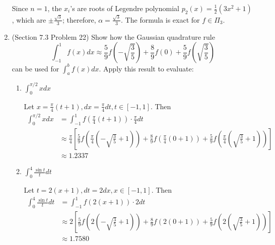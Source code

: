 \documentclass[10pt]{report}
\newcommand{\dintt}[4] {\int_{#1}^{#2} #3 d#4}
\begin{document}
\begin{enumerate}
	Since $n=1$, the $x_i$'s are roots of Legendre polynomial $p_2(x) = \frac{1}{2}(3x^2 + 1)$, which are $\pm \frac{\sqrt{3}}{3}$; therefore, $\alpha = \frac{\sqrt{3}}{3}$. The formula is exact for $f\in \Pi_3$.
	
	\item 
	(Section 7.3 Problem 22) Show how the Gaussian quadrature rule
	\[
	\dintt{-1}{1}{f(x)}{x} \approx \frac{5}{9}f\left(-\sqrt{\frac{3}{5}}\right) + \frac{8}{9}f(0) + \frac{5}{9}f\left(\sqrt{\frac{3}{5}}\right)
	\]
	can be used for $\textstyle \dintt{a}{b}{f(x)}{x}$. Apply this result to evaluate:
	\begin{enumerate}
		\item 
		$\dintt{0}{\pi/2}{x}{x}$
		
		Let $x = \frac{\pi}{4}(t+1), dx = \frac{\pi}{4}dt, t\in [-1, 1]$. Then 
		\begin{align*}
		\dintt{0}{\pi/2}{x}{x} 
		&= \dintt{-1}{1}{f\left(\frac{\pi}{4}(t+1)\right)\cdot\frac{\pi}{4}}{t} \\
		&\approx \frac{\pi}{4} \left[
		\frac{5}{9}f\left(\frac{\pi}{4}\left(-\sqrt{\frac{3}{5}}+1\right)\right) 
		+ \frac{8}{9}f\left(\frac{\pi}{4}\left(0+1\right)\right) 
		+ \frac{5}{9}f\left(\frac{\pi}{4}\left(\sqrt{\frac{3}{5}}+1\right)\right) 
		\right]\\
		&\approx 1.2337
		\end{align*}
		
		\item 
		$\dintt{0}{4}{\frac{\sin{t}}{t}}{t}$
		
		Let $t =2(x+1), dt = 2dx, x\in [-1, 1]$. Then 
		\begin{align*}
		\dintt{0}{4}{\frac{\sin{t}}{t}}{t}
		&= \dintt{-1}{1}{f(2(x+1))\cdot2}{t} \\
		&\approx 2 \left[
		\frac{5}{9}f\left(2\left(-\sqrt{\frac{3}{5}}+1\right)\right) 
		+ \frac{8}{9}f\left(2\left(0+1\right)\right) 
		+ \frac{5}{9}f\left(2\left(\sqrt{\frac{3}{5}}+1\right)\right) 
		\right]\\
		&\approx 1.7580
		\end{align*}
	\end{enumerate}
\end{enumerate}
\end{document}

